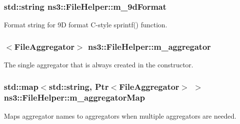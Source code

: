 \subsubsection[{\texorpdfstring{m\+\_\+9d\+Format}{m_9dFormat}}]{\setlength{\rightskip}{0pt plus 5cm}std\+::string ns3\+::\+File\+Helper\+::m\+\_\+9d\+Format\hspace{0.3cm}{\ttfamily [private]}}\hypertarget{classns3_1_1FileHelper_a672359899beed72cb7aee27809672905}{}\label{classns3_1_1FileHelper_a672359899beed72cb7aee27809672905}


Format string for 9D format C-\/style sprintf() function. 

\subsubsection[{\texorpdfstring{m\+\_\+aggregator}{m_aggregator}}]{$<${\bf File\+Aggregator}$>$ ns3\+::\+File\+Helper\+::m\+\_\+aggregator\hspace{0.3cm}{\ttfamily [private]}}\hypertarget{classns3_1_1FileHelper_ac94b4ba749d782ea407482bc699ee436}{}\label{classns3_1_1FileHelper_ac94b4ba749d782ea407482bc699ee436}


The single aggregator that is always created in the constructor. 

\subsubsection[{\texorpdfstring{m\+\_\+aggregator\+Map}{m_aggregatorMap}}]{\setlength{\rightskip}{0pt plus 5cm}std\+::map$<$std\+::string, {\bf Ptr}$<${\bf File\+Aggregator}$>$ $>$ ns3\+::\+File\+Helper\+::m\+\_\+aggregator\+Map\hspace{0.3cm}{\ttfamily [private]}}\hypertarget{classns3_1_1FileHelper_a3720f097dd381b699a2b852def0f4168}{}\label{classns3_1_1FileHelper_a3720f097dd381b699a2b852def0f4168}
Maps aggregator names to aggregators when multiple aggregators are needed. 
